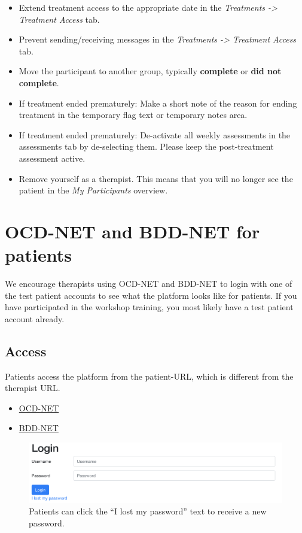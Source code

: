 \documentclass[]{book}
\providecommand{\tightlist}{%
  \setlength{\itemsep}{0pt}\setlength{\parskip}{0pt}}
\begin{document}
\begin{itemize}
\tightlist
\item
  Extend treatment access to the appropriate date in the \emph{Treatments -\textgreater{} Treatment Access} tab.
\item
  Prevent sending/receiving messages in the \emph{Treatments -\textgreater{} Treatment Access} tab.
\item
  Move the participant to another group, typically \textbf{complete} or \textbf{did not complete}.
\item
  If treatment ended prematurely: Make a short note of the reason for ending treatment in the temporary flag text or temporary notes area.
\item
  If treatment ended prematurely: De-activate all weekly assessments in the assessments tab by de-selecting them. Please keep the post-treatment assessment active.
\item
  Remove yourself as a therapist. This means that you will no longer see the patient in the \emph{My Participants} overview.
\end{itemize}

\hypertarget{ocd-net-and-bdd-net-for-patients}{%
\section{OCD-NET and BDD-NET for patients}\label{ocd-net-and-bdd-net-for-patients}}

We encourage therapists using OCD-NET and BDD-NET to login with one of the test patient accounts to see what the platform looks like for patients. If you have participated in the workshop training, you most likely have a test patient account already.

\hypertarget{access}{%
\subsection{Access}\label{access}}

Patients access the platform from the patient-URL, which is different from the therapist URL.

\begin{itemize}
\tightlist
\item
  \href{https://ocdnet.webcbt.se}{OCD-NET}\\
\item
  \href{https://bddnet.webcbt.se}{BDD-NET}
\end{itemize}

\begin{figure}
\centering
\includegraphics{images/patient-login.png}
\caption{Patients can click the ``I lost my password'' text to receive a new password.}
\end{figure}
\end{document}
